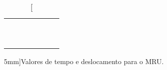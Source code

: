\begin{table*}[!ht]
\begin{tabular}{lp{25mm}p{25mm}p{25mm}p{25mm}p{25mm}l}
	\cmidrule{2-4}
	& \cellcolor[gray]{0.89} & \cellcolor[gray]{0.92} & \cellcolor[gray]{0.89} \\ 
	& \cellcolor[gray]{0.95} & \cellcolor[gray]{0.97} & \cellcolor[gray]{0.95} \\ 
	& \cellcolor[gray]{0.89} & \cellcolor[gray]{0.92} & \cellcolor[gray]{0.89} \\ 
	& \cellcolor[gray]{0.95} & \cellcolor[gray]{0.97} & \cellcolor[gray]{0.95} \\ 
	& \cellcolor[gray]{0.89} & \cellcolor[gray]{0.92} & \cellcolor[gray]{0.89} \\ 
	& \cellcolor[gray]{0.95} & \cellcolor[gray]{0.97} & \cellcolor[gray]{0.95} \\ 
	& \cellcolor[gray]{0.89} & \cellcolor[gray]{0.92} & \cellcolor[gray]{0.89} \\ 
	& \cellcolor[gray]{0.95} & \cellcolor[gray]{0.97} & \cellcolor[gray]{0.95} \\ 
	& \cellcolor[gray]{0.89} & \cellcolor[gray]{0.92} & \cellcolor[gray]{0.89} \\ 
	& \cellcolor[gray]{0.95} & \cellcolor[gray]{0.97} & \cellcolor[gray]{0.95} \\ 
	\cmidrule{2-4}
\bottomrule
\end{tabular}
\caption[][5mm]{Valores de tempo e deslocamento para o MRU.}
\label{DadosMRU}
\end{table*}

